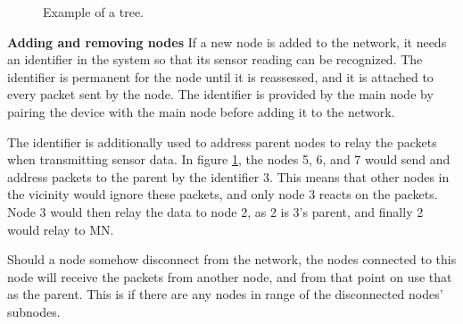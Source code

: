 \begin{figure}[!h]
	\centering
	\caption{Example of a tree.}
	\label{fig:prottree1}
\end{figure}

\textbf{Adding and removing nodes}\newline
If a new node is added to the network, it needs an identifier in the system so that its sensor reading can be recognized. The identifier is permanent for the node until it is reassessed, and it is attached to every packet sent by the node.
The identifier is provided by the main node by pairing the device with the main node before adding it to the network. 

The identifier is additionally used to address parent nodes to relay the packets when transmitting sensor data. In figure \ref{fig:prottree1}, the nodes 5, 6, and 7 would send and address packets to the parent by the identifier 3. This means that other nodes in the vicinity would ignore these packets, and only node 3 reacts on the packets. Node 3 would then relay the data to node 2, as 2 is 3's parent, and finally 2 would relay to MN.

Should a node somehow disconnect from the network, the nodes connected to this node will receive the packets from another node, and from that point on use that as the parent. This is  if there are any nodes in range of the disconnected nodes' subnodes. 

